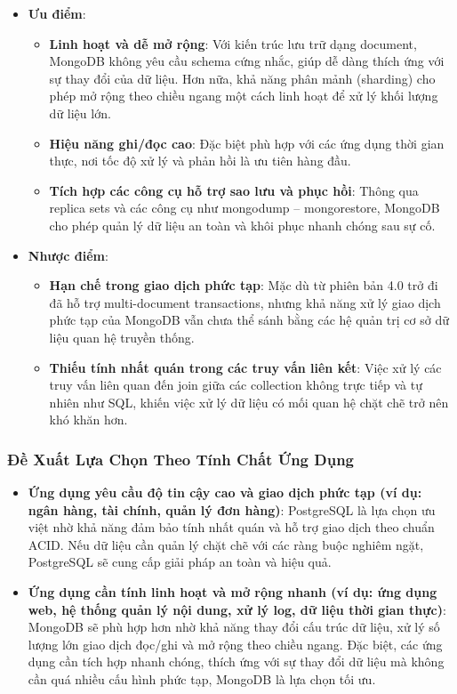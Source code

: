 \begin{itemize}
    \item \textbf{Ưu điểm}:
    \begin{itemize}
        \item \textbf{Linh hoạt và dễ mở rộng}: Với kiến trúc lưu trữ dạng document, MongoDB không yêu cầu schema cứng nhắc, giúp dễ dàng thích ứng với sự thay đổi của dữ liệu. Hơn nữa, khả năng phân mảnh (sharding) cho phép mở rộng theo chiều ngang một cách linh hoạt để xử lý khối lượng dữ liệu lớn.
        \item \textbf{Hiệu năng ghi/đọc cao}: Đặc biệt phù hợp với các ứng dụng thời gian thực, nơi tốc độ xử lý và phản hồi là ưu tiên hàng đầu.
        \item \textbf{Tích hợp các công cụ hỗ trợ sao lưu và phục hồi}: Thông qua replica sets và các công cụ như mongodump – mongorestore, MongoDB cho phép quản lý dữ liệu an toàn và khôi phục nhanh chóng sau sự cố.
    \end{itemize}
    \item \textbf{Nhược điểm}:
    \begin{itemize}
        \item \textbf{Hạn chế trong giao dịch phức tạp}: Mặc dù từ phiên bản 4.0 trở đi đã hỗ trợ multi-document transactions, nhưng khả năng xử lý giao dịch phức tạp của MongoDB vẫn chưa thể sánh bằng các hệ quản trị cơ sở dữ liệu quan hệ truyền thống.
        \item \textbf{Thiếu tính nhất quán trong các truy vấn liên kết}: Việc xử lý các truy vấn liên quan đến join giữa các collection không trực tiếp và tự nhiên như SQL, khiến việc xử lý dữ liệu có mối quan hệ chặt chẽ trở nên khó khăn hơn.
    \end{itemize}
\end{itemize}

\subsubsection{Đề Xuất Lựa Chọn Theo Tính Chất Ứng Dụng}

\begin{itemize}
    \item \textbf{Ứng dụng yêu cầu độ tin cậy cao và giao dịch phức tạp (ví dụ: ngân hàng, tài chính, quản lý đơn hàng)}: PostgreSQL là lựa chọn ưu việt nhờ khả năng đảm bảo tính nhất quán và hỗ trợ giao dịch theo chuẩn ACID. Nếu dữ liệu cần quản lý chặt chẽ với các ràng buộc nghiêm ngặt, PostgreSQL sẽ cung cấp giải pháp an toàn và hiệu quả.
    \item \textbf{Ứng dụng cần tính linh hoạt và mở rộng nhanh (ví dụ: ứng dụng web, hệ thống quản lý nội dung, xử lý log, dữ liệu thời gian thực)}: MongoDB sẽ phù hợp hơn nhờ khả năng thay đổi cấu trúc dữ liệu, xử lý số lượng lớn giao dịch đọc/ghi và mở rộng theo chiều ngang. Đặc biệt, các ứng dụng cần tích hợp nhanh chóng, thích ứng với sự thay đổi dữ liệu mà không cần quá nhiều cấu hình phức tạp, MongoDB là lựa chọn tối ưu.
\end{itemize}

